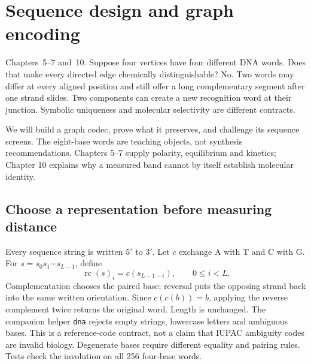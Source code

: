 \chapter{Sequence design and graph encoding}
{Chapters~5--7 and~10.}
Suppose four vertices have four different DNA words. Does that make every
directed edge chemically distinguishable? No. Two words may differ at every
aligned position and still offer a long complementary segment after one strand
slides. Two components can create a new recognition word at their junction.
Symbolic uniqueness and molecular selectivity are different contracts.

We will build a graph codec, prove what it preserves, and challenge its sequence
screens. The eight-base words are teaching objects, not synthesis recommendations.
Chapters 5--7 supply polarity, equilibrium and kinetics; Chapter 10 explains
why a measured band cannot by itself establish molecular identity.

\section{Choose a representation before measuring distance}
Every sequence string is written $5'$ to $3'$. Let $c$ exchange A with T
and C with G. For $s=s_0s_1\cdots s_{L-1}$, define
\begin{equation}
 \operatorname{rc}(s)_i=c(s_{L-1-i}),\qquad 0\le i<L.
\end{equation}
Complementation chooses the paired base; reversal puts the opposing strand
back into the same written orientation. Since $c(c(b))=b$, applying the
reverse complement twice returns the original word. Length is unchanged.
The companion helper \texttt{dna} rejects empty strings, lowercase letters
and ambiguous bases. This is a reference-code contract, not a claim that
IUPAC ambiguity codes are invalid biology. Degenerate bases require different
equality and pairing rules. Tests check the involution on all 256 four-base words.

